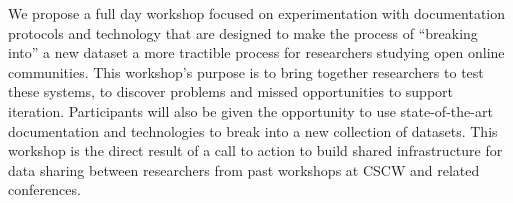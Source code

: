 We propose a full day workshop focused on
experimentation with documentation protocols and
technology that are designed to make the process
of ``breaking into'' a new dataset a more tractible
process for researchers studying open online communities.
This workshop's purpose is to bring together researchers
to test these systems, to discover problems and missed
opportunities to support iteration.  Participants
will also be given the opportunity to use state-of-the-art
documentation and technologies to break into a new collection
of datasets.  This workshop is the direct result of a call
to action to build shared infrastructure for data sharing
between researchers from past workshops at CSCW and related
conferences.
